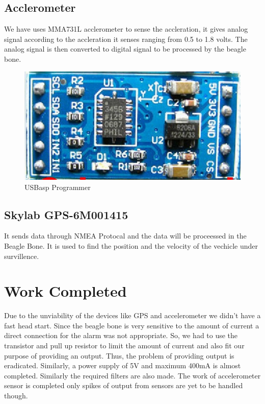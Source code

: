 \documentclass[11pt,a4paper]{article}
\begin{document}
\subsection{Acclerometer}
We have uses MMA731L acclerometer to sense the accleration, it gives analog signal according to the accleration it senses ranging from 0.5 to 1.8 volts. The analog signal is then converted to digital signal to be processed by the beagle bone.

\begin{figure}[hbtp]
\centering
\includegraphics[scale=.4]{BaleImages/Acclerometer.png}
\caption{USBasp Programmer}
\end{figure}

\subsection{Skylab GPS-6M001415}
It sends data through NMEA Protocal and the data will be proceessed in the Beagle Bone. It is used to find the position and the velocity of the vechicle under survillence.


\section{Work Completed}
Due to the unviability of the devices like GPS and accelerometer we didn’t have a fast head start. Since the beagle bone is very sensitive to the amount of current a direct connection for the alarm was not appropriate. So, we had to use the transistor and pull up resistor to limit the amount of current and also fit our purpose of providing an output. Thus, the problem of providing output is eradicated.
Similarly, a power supply of 5V and maximum 400mA is almost completed. Similarly the required filters are also made.
The work of accelerometer sensor is completed only spikes of output from sensors are yet to be handled though.  
				
\end{document}
